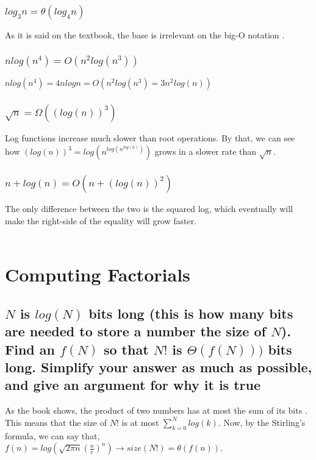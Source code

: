 \documentclass[11pt]{article}
\begin{document}
\subsubsection{\(log_{3}n = \theta(log_{4}n)\)}
\label{sec:org3631f85}
As it is said on the textbook, the base is irrelevant on the big-O notation \cite[p. 22]{Alg}.\\
\subsubsection{\(nlog(n^4) = O(n^{2}log(n^3))\)}
\label{sec:org1bb6581}
\(nlog(n^4) = 4nlogn = O(n^{2}log(n^3) = 3n^{2}^{}log(n))\)\\
\subsubsection{\(\sqrt{n} = \Omega((log(n))^3)\)}
\label{sec:orgfa952ce}
Log functions increase much slower than root operations. By that, we can see how \((log(n))^3 = log(n^{log(n^{log(n)})})\) grows in a slower rate than \(\sqrt{n}\).\\
\subsubsection{\(n + log(n) = O(n + (log(n))^2)\)}
\label{sec:orga551408}
The only difference between the two is the squared log, which eventually will make the right-side of the equality will grow faster.\\
\newpage\\
\section{Computing Factorials}
\label{sec:org17447f5}
\subsection{\(N\) is  \(log(N)\) bits long (this is how many bits are needed to store a number the size of \(N\)). Find an \(f(N)\) so that \(N!\) is \(Θ(f(N)))\) bits long. Simplify your answer as much as possible, and give an argument for why it is true}
\label{sec:orga72e244}

As the book shows, the product of two numbers has at most the sum of its bits \cite[p. 24]{Alg}. This means that the size of \(N!\) is at most \(\sum_{k=0}^{N}log(k)\). Now, by the Stirling's formula, we can say that, \(f(n) = log(\sqrt{2\pi n}(\frac{n}{e})^n) \to size(N!) = \theta(f(n))\).\\
\end{document}
